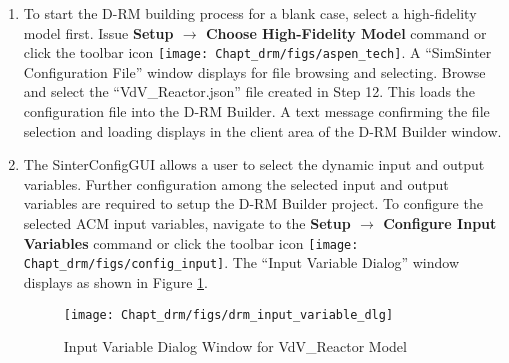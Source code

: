 \begin{enumerate}
	\item To start the D-RM building process for a blank case, select a high-fidelity model first.  Issue \textbf{Setup $\rightarrow$ Choose High-Fidelity Model} command or click the toolbar icon \texttt{[image: Chapt\_drm/figs/aspen\_tech]}.  A ``SimSinter Configuration File'' window displays for file browsing and selecting.  Browse and select the ``VdV\_Reactor.json'' file created in Step 12.  This loads the configuration file into the D-RM Builder.  A text message confirming the file selection and loading displays in the client area of the D-RM Builder window.
	\item The SinterConfigGUI allows a user to select the dynamic input and output variables.  Further configuration among the selected input and output variables are required to setup the D-RM Builder project.  To configure the selected ACM input variables, navigate to the \textbf{Setup $\rightarrow$ Configure Input Variables} command or click the toolbar icon \texttt{[image: Chapt\_drm/figs/config\_input]}.  The ``Input Variable Dialog'' window displays as shown in Figure \ref{fig.drm_input_variable_dlg}.
	\begin{figure}[H]
		\begin{center}
			\texttt{[image: Chapt\_drm/figs/drm\_input\_variable\_dlg]}
			\caption{Input Variable Dialog Window for VdV\_Reactor Model}
			\label{fig.drm_input_variable_dlg}
		\end{center}
	\end{figure}

\end{enumerate}
